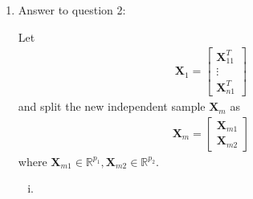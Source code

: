 \documentclass[12pt]{article}
\newcommand{\XX}{\boldsymbol{X}}
\newcommand{\BB}{\boldsymbol{\beta}}
\newcommand{\Cov}{\mathbf{Cov}}
\newcommand{\MSE}{\mathbf{MSE}}
\newcommand{\Xnew}{\boldsymbol{X}_m}
\newcommand{\Ynew}{Y_m}
\begin{document}
\begin{enumerate}
\begin{enumerate}[(i)]
\item
We denote the new independent sample to be predicted as $( \Xnew, \Ynew)$, because we have defined $\XX = \begin{bmatrix} \XX_1^T \\ \vdots \\ \XX_n^T \end{bmatrix}$ and $Y = \begin{bmatrix}Y_1 \\ \vdots \\ Y_n\end{bmatrix}$.
\begin{align}
    \MSE (\hat Y_{LS}) 
    & = \mathbb{E}\left( \Ynew - \hat Y_{LS} \right) ^2 \\
    & = \mathbb{E}\left( \Xnew^T \BB + \epsilon - \hat Y_{LS} \right) ^2 \\
    & = \mathbb{E}\left( \Xnew^T \BB - \hat Y_{LS} \right) ^2 + \mathbb{E} (\epsilon ^2) \\
    & = \left[\mathbb{E}\left( \Xnew^T \BB - \hat Y_{LS} \right) \right]^2 + \Cov (\Xnew^T \BB - \hat Y_{LS}) + \sigma^2 \\
    & = \left[\mathbb{E}\left( \Xnew^T \BB - \hat Y_{LS} \right) \right]^2 + \Cov (\hat Y_{LS}) + \sigma^2
\end{align}
where
\begin{align}
    \mathbb{E}\left( \Xnew^T \BB - \hat Y_{LS} \right) 
    & = \Xnew^T \BB - \mathbb{E}\left( \hat Y_{LS} \right) \\
    & = \Xnew^T \BB - \mathbb{E}\left( \Xnew^T \hat \BB_{LS} \right) \\
    & = 0
\end{align}
and 
\begin{align}
    \Cov (\hat Y_{LS}) & = \Xnew^T \Cov (\hat \BB_{LS}) \Xnew \\
    & = \sigma^2 \Xnew^T (\XX^T \XX) ^{-1} \Xnew
\end{align}
Therefore,
\begin{align}
    \MSE (\hat Y_{LS}) & = \sigma^2 \left( \Xnew^T (\XX^T \XX) ^{-1} \Xnew + 1 \right)
\end{align}
\end{enumerate}


\item Answer to question 2:

Let 
\begin{gather}
    \XX_1 = \begin{bmatrix} \XX_{11}^T \\ \vdots \\ \XX_{n1}^T \end{bmatrix} 
\end{gather}
and split the new independent sample $\XX_m$ as
\begin{gather}
    \XX_m = \begin{bmatrix} \XX_{m1}  \\ \XX_{m2} \end{bmatrix}
\end{gather}
where $\XX_{m1} \in \mathbb{R}^{p_1}, \XX_{m2} \in \mathbb{R}^{p_2}$.
\begin{enumerate}[(i)]
\item


\end{enumerate}
\end{enumerate}
\end{document}
